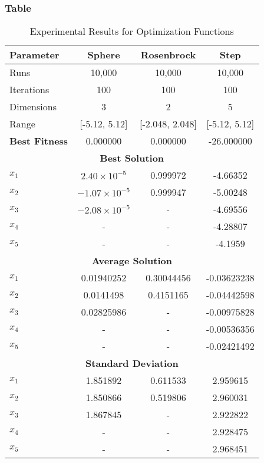 \documentclass{article}
\begin{document}
\subsubsection{Table}
\begin{table}[H]
\centering
\caption{Experimental Results for Optimization Functions}
\label{tab:results}
\begin{tabular}{|l|c|c|c|}
\hline
\textbf{Parameter} & \textbf{Sphere} & \textbf{Rosenbrock} & \textbf{Step} \\
\hline
Runs & 10,000 & 10,000 & 10,000 \\
Iterations & 100 & 100 & 100 \\
Dimensions & 3 & 2 & 5 \\
Range & [-5.12, 5.12] & [-2.048, 2.048] & [-5.12, 5.12] \\
\hline
\textbf{Best Fitness} & 0.000000 & 0.000000 & -26.000000 \\
\hline
\multicolumn{4}{|c|}{\textbf{Best Solution}} \\
\hline
$x_1$ & $2.40 \times 10^{-5}$ & 0.999972 & -4.66352 \\
$x_2$ & $-1.07 \times 10^{-5}$ & 0.999947 & -5.00248 \\
$x_3$ & $-2.08 \times 10^{-5}$ & - & -4.69556 \\
$x_4$ & - & - & -4.28807 \\
$x_5$ & - & - & -4.1959 \\
\hline
\multicolumn{4}{|c|}{\textbf{Average Solution}} \\
\hline
$x_1$ & 0.01940252 & 0.30044456 & -0.03623238 \\
$x_2$ & 0.0141498 & 0.4151165 & -0.04442598 \\
$x_3$ & 0.02825986 & - & -0.00975828 \\
$x_4$ & - & - & -0.00536356 \\
$x_5$ & - & - & -0.02421492 \\
\hline
\multicolumn{4}{|c|}{\textbf{Standard Deviation}} \\
\hline
$x_1$ & 1.851892 & 0.611533 & 2.959615 \\
$x_2$ & 1.850866 & 0.519806 & 2.960031 \\
$x_3$ & 1.867845 & - & 2.922822 \\
$x_4$ & - & - & 2.928475 \\
$x_5$ & - & - & 2.968451 \\
\hline
\end{tabular}
\end{table}
\end{document}
